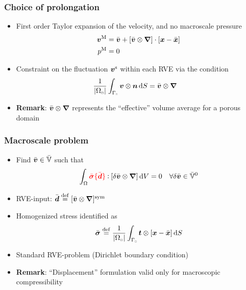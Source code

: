 \documentclass[11pt]{beamer} %
\newcommand{\highlight}[1]{{\color{red}#1}}
\newcommand{\volume}{|\Omega_\rve|}
\newcommand{\rve}{
  {\mathchoice
   {\mbox{\scalebox{0.67}{$\Box$}}}
   {\mbox{\scalebox{0.67}{$\Box$}}}
   {\mbox{\scalebox{0.5}{$\Box$}}}
   {\mbox{\scalebox{0.375}{$\Box$}}}
  }
}
\begin{document}
\begin{frame}
 \frametitle{Choice of prolongation}
\begin{itemize}
 \item First order Taylor expansion of the velocity, and no macroscale pressure
\begin{align*}
 \boldsymbol{v}^{\mathrm{M}} &= \bar{\boldsymbol{v}} + [\bar{\boldsymbol{v}}\mathbin{\otimes}\boldsymbol{\nabla}]\cdot[\boldsymbol{x} - \bar{\boldsymbol{x}}]
\\
 p^{\mathrm{M}} &= 0
\end{align*}
\item Constraint on the fluctuation $\boldsymbol{v}^{\mathrm{s}}$ within each RVE via the condition
\begin{align*}
 \frac{1}{\volume} \int_{\Gamma_\rve} \ta v\outerp\ta n \dif S &= \bar{\ta v}\outerp\diff
\end{align*}
\item \textbf{Remark}: $\bar{\boldsymbol{v}}\mathbin{\otimes}\boldsymbol{\nabla}$ represents the ``effective'' volume average for a porous domain
\end{itemize}
\end{frame}

\begin{frame}
 \frametitle{Macroscale problem}
\begin{itemize}
 \item Find $\bar{\boldsymbol{v}} \in \bar{\mathbb{V}}$ such that
 \begin{align*}
  \int_\Omega \highlight{\bar{\ts\sigma}\{\bar{\ts d}\}}\dprod[\delta\bar{\ta v}\outerp\diff]\dif V = 0\quad \forall \delta\bar{\ta v} \in \bar{\set{V}}^0
 \end{align*}
 \item RVE-input: $\bar{\boldsymbol{d}} \overset{\mathrm{def}}{=} [\bar{\boldsymbol{v}}\mathbin{\otimes}\boldsymbol{\nabla}]^{\mathrm{sym}}$
 \item Homogenized stress identified as
 \begin{align*}
  \bar{\ts\sigma} \defeq \frac{1}{\volume} \int_{\Gamma_\rve} \ta t \outerp [\ta x-\bar{\ta x}]\dif S
 \end{align*}
 \item Standard RVE-problem (Dirichlet boundary condition)
 \item \textbf{Remark}: ``Displacement'' formulation valid only for macroscopic compressibility
\end{itemize}
\end{frame}
\end{document}

